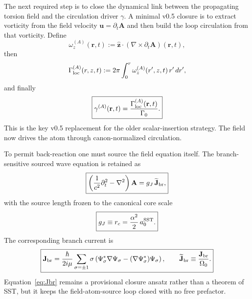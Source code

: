 \documentclass[11pt,a4paper]{article}
\begin{document}
The next required step is to close the dynamical link between the propagating torsion field and the circulation driver $\gamma$. A minimal v0.5 closure is to extract vorticity from the field velocity $\mathbf u=\partial_t\mathbf A$ and then build the loop circulation from that vorticity. Define
\begin{equation}
\label{eq:omegaA}
\omega_z^{(A)}(\mathbf r,t)
:=
\hat{\mathbf z}\cdot\left(\nabla\times \partial_t \mathbf A\right)(\mathbf r,t),
\end{equation}
then
\begin{equation}
\label{eq:GammaA}
\Gamma_{\rm loc}^{(A)}(r,z,t)
:=
2\pi\int_0^r \omega_z^{(A)}(r',z,t)\,r'\,dr',
\end{equation}
and finally
\begin{equation}
\label{eq:gammaA}
\boxed{
\gamma^{(A)}(\mathbf r,t)
=
\frac{\Gamma_{\rm loc}^{(A)}(\mathbf r,t)}{\Gamma_0}.
}
\end{equation}
This is the key v0.5 replacement for the older scalar-insertion strategy. The field now drives the atom through canon-normalized circulation.

To permit back-reaction one must source the field equation itself. The branch-sensitive sourced wave equation is retained as
\begin{equation}
\label{eq:Awave-source}
\boxed{
\left(\frac{1}{c^2}\partial_t^2-\nabla^2\right)\mathbf A
=
g_J \,\widetilde{\mathbf J}_{\rm br},
}
\end{equation}
with the source length frozen to the canonical core scale
\begin{equation}
\label{eq:gJfreeze}
\boxed{
 g_J \equiv r_c = \frac{\alpha^2}{2}\,a_0^{\rm SST}.
}
\end{equation}
The corresponding branch current is
\begin{equation}
\label{eq:Jbr}
\boxed{
\mathbf J_{\rm br}
=
\frac{\hbar}{2 i \mu}
\sum_{\sigma=\pm 1}
\sigma
\left(
\Psi_\sigma^*\nabla\Psi_\sigma
-
(\nabla\Psi_\sigma^*)\Psi_\sigma
\right),
\qquad
\widetilde{\mathbf J}_{\rm br}\equiv \frac{\mathbf J_{\rm br}}{\Omega_0}.
}
\end{equation}
Equation~\eqref{eq:Jbr} remains a provisional closure ansatz rather than a theorem of SST, but it keeps the field-atom-source loop closed with no free prefactor.
\end{document}
